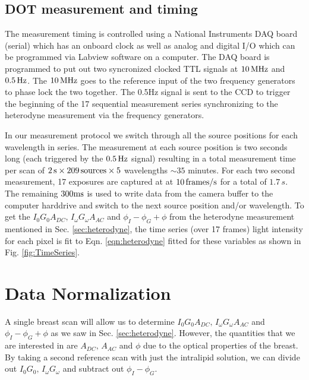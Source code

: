 \subsection{DOT measurement and timing}
The measurement timing is controlled using a National Instruments DAQ board (serial) which has an onboard clock as well as analog and digital I/O which can be programmed via Labview software on a computer. The DAQ board is programmed to put out two syncronized clocked TTL signals at $10\,{\rm MHz}$ and $0.5\,{\rm Hz}$. The $10\,{\rm MHz}$ goes to the reference input of the two frequency generators to phase lock the two together. The 0.5Hz signal is sent to the CCD to trigger the beginning of the 17 sequential measurement series synchronizing to the heterodyne measurement via the frequency generators.

In our measurement protocol we switch through all the source positions for each wavelength in series. The measurement at each source position is two seconds long (each triggered by the $0.5\,{\rm Hz}$ signal) resulting in a total measurement time per scan of $2\,{\rm s} \times 209\,{\rm sources} \times 5$ wavelengths $\sim 35$ minutes. For each two second measurement, 17 exposures are captured at at $10\,{\rm frames/s}$ for a total of $1.7\,s$. The remaining $300 {\rm ms}$ is used to write data from the camera buffer to the computer harddrive and switch to the next source position and/or wavelength. To get the $I_{0}G_{0}A_{DC},\,I_{\omega}G_{\omega}A_{AC}$ and $\phi_I-\phi_G+\phi$ from the heterodyne measurement mentioned in Sec. \ref{sec:heterodyne}, the time series (over 17 frames) light intensity for each pixel is fit to Eqn. \ref{eqn:heterodyne} fitted for these variables as shown in Fig. \ref{fig:TimeSeries}. 


\section{Data Normalization}
A single breast scan will allow us to determine $I_{0}G_{0}A_{DC},\,I_{\omega}G_{\omega}A_{AC}$ and $\phi_I-\phi_G+\phi$ as we saw in Sec. \ref{sec:heterodyne}. However, the quantities that we are interested in are $A_{DC},\,A_{AC}$ and $\phi$ due to the optical properties of the breast. By taking a second reference scan with just the intralipid solution, we can divide out $I_{0}G_{0},\,I_{\omega}G_{\omega}$ and subtract out $\phi_I-\phi_G$.

